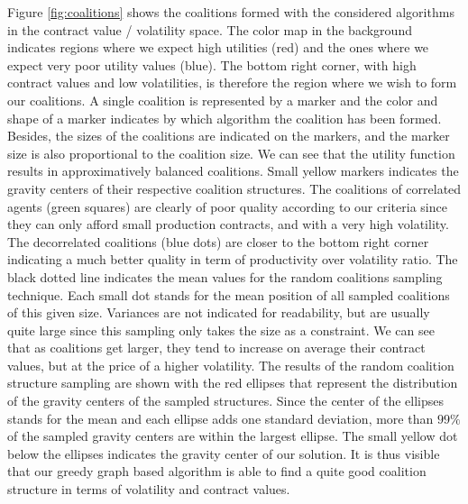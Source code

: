 \documentclass[journal]{IEEEtran}
\begin{document}
Figure \ref{fig:coalitions} shows the coalitions formed with the considered algorithms in the contract value / volatility space. The color map in the background indicates regions where we expect high utilities (red) and the ones where we expect very poor utility values (blue). The bottom right corner, with high contract values and low volatilities, is therefore the region where we wish to form our coalitions. A single coalition is represented by a marker and the color and shape of a marker indicates by which algorithm the coalition has been formed. Besides, the sizes of the coalitions are indicated on the markers, and the marker size is also proportional to the coalition size. We can see that the utility function results in approximatively balanced coalitions. Small yellow markers indicates the gravity centers of their respective coalition structures. The coalitions of correlated agents (green squares) are clearly of poor quality according to our criteria since they can only afford small production contracts, and with a very high volatility. The decorrelated coalitions (blue dots) are closer to the bottom right corner indicating a much better quality in term of productivity over volatility ratio. The black dotted line indicates the mean values for the random coalitions sampling technique. Each small dot stands for the mean position of all sampled coalitions of this given size. Variances are not indicated for readability, but are usually quite large since this sampling only takes the size as a constraint. We can see that as coalitions get larger, they tend to increase on average their contract values, but at the price of a higher volatility. The results of the random coalition structure sampling are shown with the red ellipses that represent the distribution of the gravity centers of the sampled structures. Since the center of the ellipses stands for the mean and each ellipse adds one standard deviation, more than $ 99\% $ of the sampled gravity centers are within the largest ellipse. The small yellow dot below the ellipses indicates the gravity center of our solution. It is thus visible that our greedy graph based algorithm is able to find a quite good coalition structure in terms of volatility and contract values.
\end{document}
